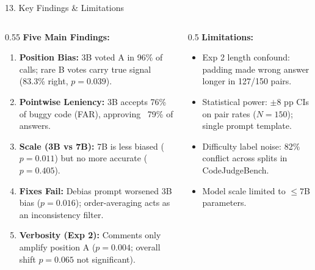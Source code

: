 \documentclass[aspectratio=169]{beamer}
\begin{document}
\begin{frame}{13. Key Findings \& Limitations}
  \begin{columns}
    \begin{column}{0.55\textwidth}
      \textbf{Five Main Findings:}
      \begin{enumerate}
        \item \textbf{Position Bias:} 3B voted A in 96\% of calls; rare B votes carry true signal (83.3\% right, $p=0.039$).
        \item \textbf{Pointwise Leniency:} 3B accepts 76\% of buggy code (FAR), approving ~79\% of answers.
        \item \textbf{Scale (3B vs 7B):} 7B is less biased ($p=0.011$) but no more accurate ($p=0.405$).
        \item \textbf{Fixes Fail:} Debias prompt worsened 3B bias ($p=0.016$); order-averaging acts as an inconsistency filter.
        \item \textbf{Verbosity (Exp 2):} Comments only amplify position A ($p=0.004$; overall shift $p=0.065$ not significant).
      \end{enumerate}
    \end{column}
    \begin{column}{0.5\textwidth}
      \textbf{Limitations:}
      \begin{itemize}
        \item Exp 2 length confound: padding made wrong answer longer in 127/150 pairs.
        \item Statistical power: $\pm 8$ pp CIs on pair rates ($N=150$); single prompt template.
        \item Difficulty label noise: 82\% conflict across splits in CodeJudgeBench.
        \item Model scale limited to $\le 7$B parameters.
      \end{itemize}
    \end{column}
  \end{columns}
\end{frame}
\end{document}

